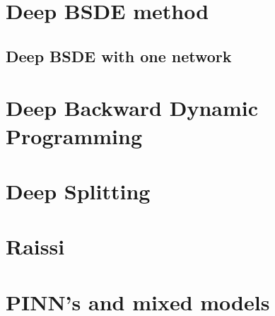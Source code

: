 \section{Deep BSDE method}
\subsection{Deep BSDE with one network}

\section{Deep Backward Dynamic Programming}
\section{Deep Splitting}
\section{Raissi}
\section{PINN's and mixed models}